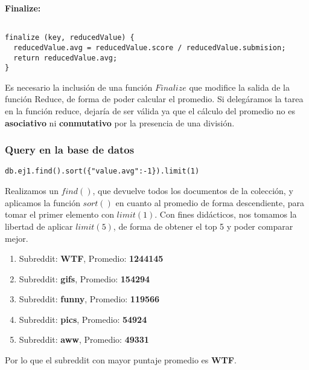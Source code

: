 \vspace{2mm}

\textbf{Finalize:}

\begin{lstlisting}

finalize (key, reducedValue) {
  reducedValue.avg = reducedValue.score / reducedValue.submision;
  return reducedValue.avg;
}

\end{lstlisting}

Es necesario la inclusi\'on de una funci\'on $Finalize$ que modifice la salida de la funci\'on Reduce, de forma de poder calcular el promedio. Si deleg\'aramos la tarea en la funci\'on reduce, dejar\'ia de ser v\'alida ya que el c\'alculo del promedio no es \textbf{asociativo} ni \textbf{conmutativo} por la presencia de una divisi\'on.

\vspace{2mm}

\subsubsection{Query en la base de datos}


\begin{lstlisting}
db.ej1.find().sort({"value.avg":-1}).limit(1)
\end{lstlisting}

Realizamos un $find()$, que devuelve todos los documentos de la colecci\'on, y aplicamos la funci\'on $sort()$ en cuanto al promedio de forma descendiente, para tomar el primer elemento con $limit(1)$. Con fines did\'acticos, nos tomamos la libertad de aplicar $limit(5)$, de forma de obtener el top 5 y poder comparar mejor.

\begin{enumerate}

\item Subreddit: \textbf{WTF}, Promedio: \textbf{1244145} 
\item Subreddit: \textbf{gifs}, Promedio: \textbf{154294}  
\item Subreddit: \textbf{funny}, Promedio: \textbf{119566}  
\item Subreddit: \textbf{pics}, Promedio: \textbf{54924}  
\item Subreddit: \textbf{aww}, Promedio: \textbf{49331}  


\end{enumerate}

Por lo que el subreddit con mayor puntaje promedio es \textbf{WTF}.

